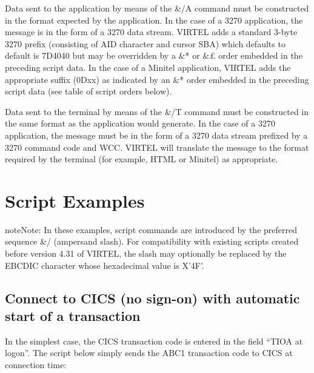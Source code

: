 \documentclass[letterpaper,10pt,english]{sphinxmanual}
\begin{document}
Data sent to the application by means of the \&/A command must be constructed in the format expected by the application. In the case of a 3270 application, the message is in the form of a 3270 data stream. VIRTEL adds a standard 3-byte 3270 prefix (consisting of AID character and cursor SBA) which defaults to default is 7D4040 but may be overridden by a \&* or \&£ order embedded in the preceding script data. In the case of a Minitel application, VIRTEL adds the appropriate suffix (0Dxx) as indicated by an \&* order embedded in the preceding script data (see table of script orders below).

Data sent to the terminal by means of the \&/T command must be constructed in the same format as the application would generate. In the case of a 3270 application, the message must be in the form of a 3270 data stream prefixed by a 3270 command code and WCC. VIRTEL will translate the message to the format required by the terminal (for example, HTML or Minitel) as appropriate.

\ignorespaces 

\section{Script Examples}
\label{\detokenize{connectivity_guide:script-examples}}\label{\detokenize{connectivity_guide:index-122}}
\begin{sphinxadmonition}{note}{Note:}
In these examples, script commands are introduced by the preferred sequence \&/ (ampersand slash). For compatibility with existing scripts created before version 4.31 of VIRTEL, the slash may optionally be replaced by the EBCDIC character whose hexadecimal value is X’4F’.
\end{sphinxadmonition}

\ignorespaces 

\subsection{Connect to CICS (no sign-on) with automatic start of a transaction}
\label{\detokenize{connectivity_guide:connect-to-cics-no-sign-on-with-automatic-start-of-a-transaction}}\label{\detokenize{connectivity_guide:index-123}}
In the simplest case, the CICS transaction code is entered in the field “TIOA at logon”. The script below simply sends the ABC1 transaction code to CICS at connection time:
\end{document}
